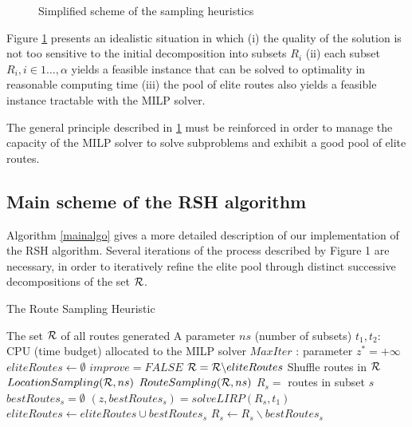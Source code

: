 \documentclass[a4paper,10pt]{article}
\begin{document}
\begin{linenumbers}
\begin{figure}[htbp]
\begin{tikzpicture}[scale=0.8, auto,swap]
	\end{tikzpicture}
	\caption{Simplified scheme of the sampling heuristics}
	\label{fig:algo1}
\end{figure}

Figure \ref{fig:algo1} presents an idealistic situation in which 
(i) the quality of the solution is not too sensitive to the initial decomposition  into subsets $R_i$  
(ii) each subset $R_i, i \in 1\dots, \alpha$ yields a feasible instance that can be solved to optimality in reasonable computing time
(iii) the pool of elite routes also yields a feasible instance tractable with the MILP solver. 

The general principle described in \ref{fig:algo1} must be reinforced in order to manage the capacity of the MILP solver to solve subproblems and exhibit a good pool of elite routes. 


\subsection{Main scheme of the RSH algorithm} \label{sec:RSH}


Algorithm \ref{mainalgo} gives a more detailed description of our implementation of the RSH algorithm. 
Several iterations of the process described by Figure 1 are necessary, in order to iteratively refine the elite pool through distinct successive decompositions of the set $\ro$. 
 

\begin{algorithm}
	\caption{The Route Sampling Heuristic}
	\label{mainalgo}
	\begin{algorithmic}[1]
		\REQUIRE  The set $\ro$ of all routes generated
		\REQUIRE A parameter $ns$ (number of subsets)
		\REQUIRE $t_1, t_2$: CPU (time budget) allocated to the MILP solver
		\REQUIRE $MaxIter$ : parameter
		\STATE $z^*= +\infty$
		\STATE $eliteRoutes \leftarrow \emptyset$
		\REPEAT
		\STATE $improve = FALSE$
		\STATE $\ro =  \ro \backslash eliteRoutes$
		\STATE Shuffle routes in $\ro$
		\STATE $LocationSampling(\ro,ns)$ 
		\STATE $RouteSampling(\ro,ns)$	
		\STATE $R_s = $ routes in subset $s$
		\STATE $bestRoutes_s = \emptyset$
		\STATE $(z,bestRoutes_s) = solveLIRP(R_s,t_1)$ 
		\STATE $eliteRoutes \leftarrow eliteRoutes \cup bestRoutes_s$
		\STATE $R_s \leftarrow R_s \backslash bestRoutes_s$
		

\end{algorithmic}
\end{algorithm}
\end{linenumbers}
\end{document}
